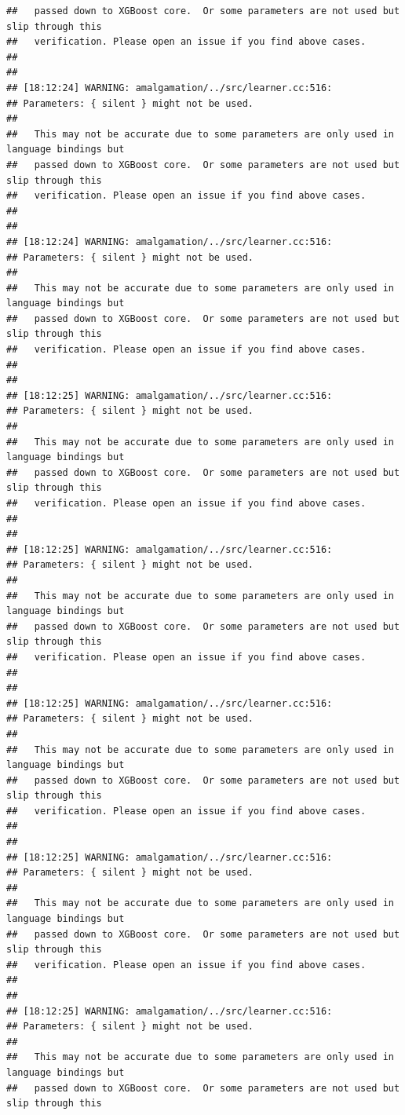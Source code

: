 \documentclass[AMS,STIX2COL]{WileyNJD-v2}\usepackage[]{graphicx}\usepackage[]{color}
\makeatletter
\newenvironment{kframe}{%
 \def\at@end@of@kframe{}%
 \ifinner\ifhmode%
  \def\at@end@of@kframe{\end{minipage}}%
  \begin{minipage}{\columnwidth}%
 \fi\fi%
 \def\FrameCommand##1{\hskip\@totalleftmargin \hskip-\fboxsep
 \colorbox{shadecolor}{##1}\hskip-\fboxsep
     \hskip-\linewidth \hskip-\@totalleftmargin \hskip\columnwidth}%
 \MakeFramed {\advance\hsize-\width
   \@totalleftmargin\z@ \linewidth\hsize
   \@setminipage}}%
 {\par\unskip\endMakeFramed%
 \at@end@of@kframe}
\newenvironment{knitrout}{}{} %
\makeatother
\begin{document}
\begin{knitrout}
\begin{kframe}
\begin{verbatim}
##   passed down to XGBoost core.  Or some parameters are not used but slip through this
##   verification. Please open an issue if you find above cases.
## 
## 
## [18:12:24] WARNING: amalgamation/../src/learner.cc:516: 
## Parameters: { silent } might not be used.
## 
##   This may not be accurate due to some parameters are only used in language bindings but
##   passed down to XGBoost core.  Or some parameters are not used but slip through this
##   verification. Please open an issue if you find above cases.
## 
## 
## [18:12:24] WARNING: amalgamation/../src/learner.cc:516: 
## Parameters: { silent } might not be used.
## 
##   This may not be accurate due to some parameters are only used in language bindings but
##   passed down to XGBoost core.  Or some parameters are not used but slip through this
##   verification. Please open an issue if you find above cases.
## 
## 
## [18:12:25] WARNING: amalgamation/../src/learner.cc:516: 
## Parameters: { silent } might not be used.
## 
##   This may not be accurate due to some parameters are only used in language bindings but
##   passed down to XGBoost core.  Or some parameters are not used but slip through this
##   verification. Please open an issue if you find above cases.
## 
## 
## [18:12:25] WARNING: amalgamation/../src/learner.cc:516: 
## Parameters: { silent } might not be used.
## 
##   This may not be accurate due to some parameters are only used in language bindings but
##   passed down to XGBoost core.  Or some parameters are not used but slip through this
##   verification. Please open an issue if you find above cases.
## 
## 
## [18:12:25] WARNING: amalgamation/../src/learner.cc:516: 
## Parameters: { silent } might not be used.
## 
##   This may not be accurate due to some parameters are only used in language bindings but
##   passed down to XGBoost core.  Or some parameters are not used but slip through this
##   verification. Please open an issue if you find above cases.
## 
## 
## [18:12:25] WARNING: amalgamation/../src/learner.cc:516: 
## Parameters: { silent } might not be used.
## 
##   This may not be accurate due to some parameters are only used in language bindings but
##   passed down to XGBoost core.  Or some parameters are not used but slip through this
##   verification. Please open an issue if you find above cases.
## 
## 
## [18:12:25] WARNING: amalgamation/../src/learner.cc:516: 
## Parameters: { silent } might not be used.
## 
##   This may not be accurate due to some parameters are only used in language bindings but
##   passed down to XGBoost core.  Or some parameters are not used but slip through this

\end{verbatim}
\end{kframe}
\end{knitrout}
\end{document}
